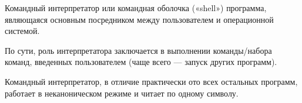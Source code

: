 \begin{defi}{Командный интерпретатор или командная оболочка («shell»)}
	программа, являющаяся основным посредником между пользователем и операционной системой. 
\end{defi}

По сути, роль интерпретатора заключается в выполнении команды/набора команд, введенных пользователем (чаще всего --- запуск других программ).

\begin{important}
	Командный интерпретатор, в отличие практически ото всех остальных программ, работает в неканоническом режиме и читает по одному символу.
\end{important}